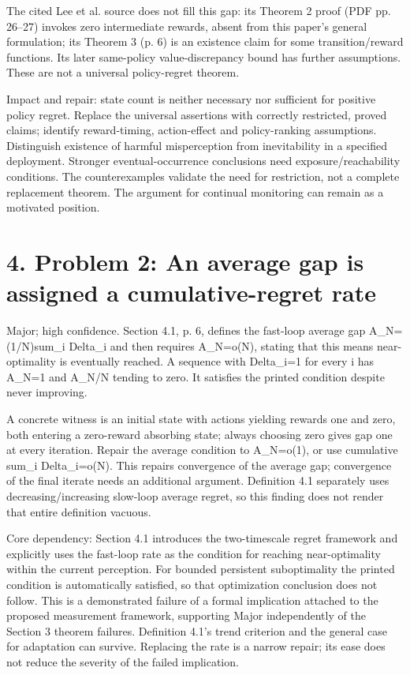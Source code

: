 \documentclass[10pt]{article}
\begin{document}
The cited Lee et al. source does not fill this gap: its Theorem 2 proof (PDF pp. 26–27) invokes zero intermediate rewards, absent from this paper’s general formulation; its Theorem 3 (p. 6) is an existence claim for some transition/reward functions. Its later same-policy value-discrepancy bound has further assumptions. These are not a universal policy-regret theorem.\par
Impact and repair: state count is neither necessary nor sufficient for positive policy regret. Replace the universal assertions with correctly restricted, proved claims; identify reward-timing, action-effect and policy-ranking assumptions. Distinguish existence of harmful misperception from inevitability in a specified deployment. Stronger eventual-occurrence conclusions need exposure/reachability conditions. The counterexamples validate the need for restriction, not a complete replacement theorem. The argument for continual monitoring can remain as a motivated position.\par
\section*{4. Problem 2: An average gap is assigned a cumulative-regret rate}
Major; high confidence. Section 4.1, p. 6, defines the fast-loop average gap A\_N=(1/N)sum\_i Delta\_i and then requires A\_N=o(N), stating that this means near-optimality is eventually reached. A sequence with Delta\_i=1 for every i has A\_N=1 and A\_N/N tending to zero. It satisfies the printed condition despite never improving.\par
A concrete witness is an initial state with actions yielding rewards one and zero, both entering a zero-reward absorbing state; always choosing zero gives gap one at every iteration. Repair the average condition to A\_N=o(1), or use cumulative sum\_i Delta\_i=o(N). This repairs convergence of the average gap; convergence of the final iterate needs an additional argument. Definition 4.1 separately uses decreasing/increasing slow-loop average regret, so this finding does not render that entire definition vacuous.\par
Core dependency: Section 4.1 introduces the two-timescale regret framework and explicitly uses the fast-loop rate as the condition for reaching near-optimality within the current perception. For bounded persistent suboptimality the printed condition is automatically satisfied, so that optimization conclusion does not follow. This is a demonstrated failure of a formal implication attached to the proposed measurement framework, supporting Major independently of the Section 3 theorem failures. Definition 4.1’s trend criterion and the general case for adaptation can survive. Replacing the rate is a narrow repair; its ease does not reduce the severity of the failed implication.\par
\end{document}
